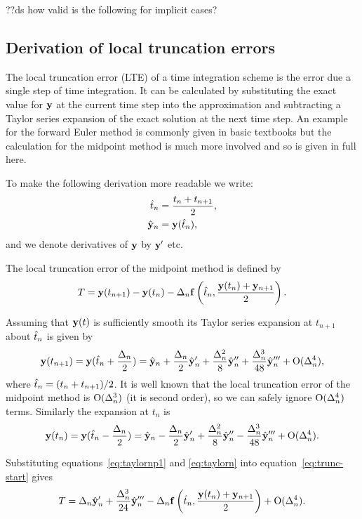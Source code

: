 ??ds how valid is the following for implicit cases?

\subsection{Derivation of local truncation errors}

The local truncation error (LTE) of a time integration scheme is the error due a single step of time integration.
It can be calculated by substituting the exact value for $\mathbf{y}$ at the current time step into the approximation and subtracting a Taylor series expansion of the exact solution at the next time step.
An example for the forward Euler method is commonly given in basic textbooks but the calculation for the midpoint method is much more involved and so is given in full here.

To make the following derivation more readable we write:
\begin{align}
  \hat{t}_n &= \frac{t_n + t_{n+1}}{2}, \notag\\
  \hat{\mathbf{y}}_n &= \mathbf{y}(\hat{t}_n), \notag\\
\end{align}
and we denote derivatives of $\mathbf{y}$ by $\mathbf{y}'$ etc.

The local truncation error of the midpoint method is defined by
\begin{equation}
  T = \mathbf{y}(t_{n+1}) - \mathbf{y}(t_n) - \Delta_{n} {\mathbf{f}}\left( \hat{t}_n, \frac{\mathbf{y}(t_n) + \mathbf{y}_{n+1}}{2} \right).
  \label{eq:trunc-start}
\end{equation}

Assuming that $\mathbf{y}(t)$ is sufficiently smooth its Taylor series expansion at $t_{n+1}$ about $\hat{t}_n$ is given by
\begin{equation}
  \mathbf{y}(t_{n+1}) = \mathbf{y}(\hat{t}_n + \frac{\Delta_{n}}{2}) = \hat{\mathbf{y}}_n + \frac{\Delta_{n}}{2} \hat{\mathbf{y}}_n' + \frac{\Delta_{n}^2}{8} \hat{\mathbf{y}}_n'' + \frac{\Delta_{n}^3}{48} \hat{\mathbf{y}}_n''' + \text{O}(\Delta_{n}^4),
  \label{eq:taylornp1}
\end{equation}
where $\hat{t}_n = (t_n + t_{n+1})/2$.
It is well known that the local truncation error of the midpoint method is $\text{O}(\Delta_{n}^3)$ (\ie it is second order), so we can safely ignore $\text{O}(\Delta_{n}^4)$ terms.
Similarly the expansion at $t_n$ is
\begin{equation}
  \mathbf{y}(t_n) = \mathbf{y}(\hat{t}_n - \frac{\Delta_{n}}{2}) = \hat{\mathbf{y}}_n - \frac{\Delta_{n}}{2} \hat{\mathbf{y}}_n' + \frac{\Delta_{n}^2}{8} \hat{\mathbf{y}}_n'' - \frac{\Delta_{n}^3}{48} \hat{\mathbf{y}}_n''' + \text{O}(\Delta_{n}^4).
  \label{eq:taylorn}
\end{equation}

Substituting equations~\eqref{eq:taylornp1} and \eqref{eq:taylorn} into equation~\eqref{eq:trunc-start} gives
\begin{equation}
  T = \Delta_{n} \hat{\mathbf{y}}_n' + \frac{\Delta_{n}^3}{24} \hat{\mathbf{y}}_n'''
  - \Delta_{n} {\mathbf{f}}\left( \hat{t}_n, \frac{\mathbf{y}(t_n) + \mathbf{y}_{n+1}}{2} \right)  + \text{O}(\Delta_{n}^4).
  \label{eq:trunc-mid}
\end{equation}

